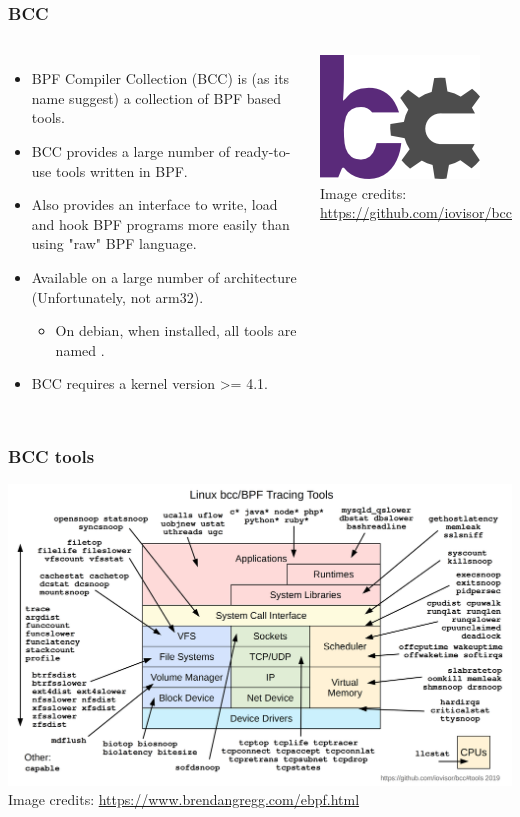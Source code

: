 \begin{frame}[fragile]
  \frametitle{BCC}
  \begin{columns}
    \begin{itemize}
      \item BPF Compiler Collection (BCC) is (as its name suggest) a collection
            of BPF based tools.
      \item BCC provides a large number of ready-to-use tools written in BPF.
      \item Also provides an interface to write, load and hook BPF programs more
            easily than using "raw" BPF language.
      \item Available on a large number of architecture (Unfortunately, not arm32).
      \begin{itemize}
        \item On debian, when installed, all tools are named .
      \end{itemize}
      \item BCC requires a kernel version >= 4.1.
    \end{itemize}
  \vspace{0.5cm}
  \includegraphics[height=0.2\textheight]{slides/debugging-linux-application-stack/logo_bcc.png}\\ 
  \tiny Image credits: \url{https://github.com/iovisor/bcc}
  \end{columns}
\end{frame}

\begin{frame}[fragile]
  \frametitle{BCC tools}
  \center\includegraphics[height=0.9\textheight]{slides/debugging-system-wide-profiling/bcc_tracing_tools_2019.png}\\ 
  \tiny Image credits: \url{https://www.brendangregg.com/ebpf.html}
\end{frame}

